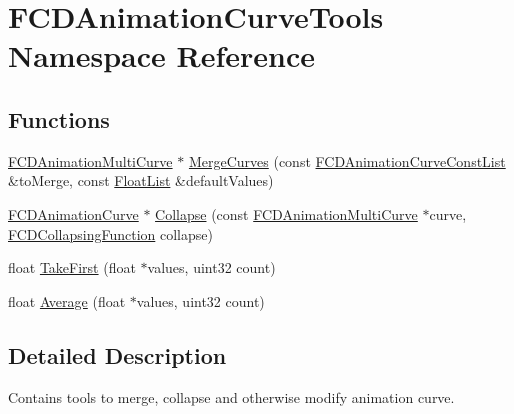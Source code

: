 \hypertarget{namespaceFCDAnimationCurveTools}{
\section{FCDAnimationCurveTools Namespace Reference}
\label{namespaceFCDAnimationCurveTools}
}
\subsection*{Functions}
\begin{DoxyCompactItemize}
\item 
\hyperlink{classFCDAnimationMultiCurve}{FCDAnimationMultiCurve} $\ast$ \hyperlink{namespaceFCDAnimationCurveTools_a890739f174e6aaf00597ea67d6710ab8}{MergeCurves} (const \hyperlink{classfm_1_1pvector}{FCDAnimationCurveConstList} \&toMerge, const \hyperlink{classfm_1_1vector}{FloatList} \&defaultValues)
\item 
\hyperlink{classFCDAnimationCurve}{FCDAnimationCurve} $\ast$ \hyperlink{namespaceFCDAnimationCurveTools_aca4a52281fdbfd6c60337c8aa07aa5ae}{Collapse} (const \hyperlink{classFCDAnimationMultiCurve}{FCDAnimationMultiCurve} $\ast$curve, \hyperlink{FCDAnimationCurveTools_8h_a108f3f31a5097fdde5a065a1c7ad0acc}{FCDCollapsingFunction} collapse)
\item 
float \hyperlink{namespaceFCDAnimationCurveTools_a52f0bc674ece31d37bef0b8cf7999a27}{TakeFirst} (float $\ast$values, uint32 count)
\item 
float \hyperlink{namespaceFCDAnimationCurveTools_ac39b972f3c91e9da8c6e6fd0b6f457dc}{Average} (float $\ast$values, uint32 count)
\end{DoxyCompactItemize}


\subsection{Detailed Description}
Contains tools to merge, collapse and otherwise modify animation curve. 

